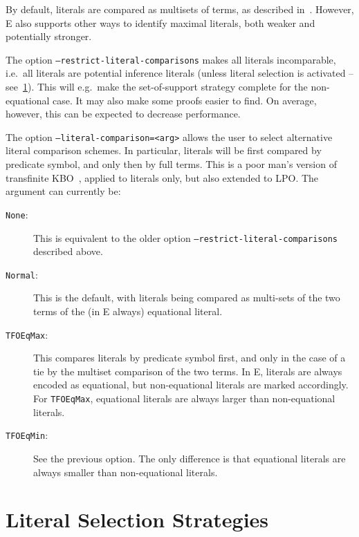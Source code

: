 \documentclass{report}
\begin{document}
By default, literals are compared as
multisets of terms, as described in~\cite{BG94}. However, E also
supports other ways to identify maximal literals, both weaker and
potentially stronger.

The option \texttt{--restrict-literal-comparisons} makes all literals
incomparable, i.e.\ all literals are potential inference literals
(unless literal selection is activated --
see~\ref{sec:options:strategies}). This will e.g.\ make the
set-of-support strategy complete for the non-equational case. It may
also make some proofs easier to find. On average, however, this can be
expected to decrease performance.

The option \texttt{--literal-comparison=<arg>} allows the user to
select alternative literal comparison schemes. In particular, literals
will be first compared by predicate symbol, and only then by full
terms. This is a poor man's version of transfinite
KBO~\cite{LW:LPAR-2007,KMV:CADE-2011}, applied to literals only, but
also extended to LPO. The argument can currently be:

\begin{description}
\item[\texttt{None}:] This is equivalent to the older option
  \texttt{--restrict-literal-comparisons} described above.
\item[\texttt{Normal}:] This is the default, with literals being
  compared as multi-sets of the two terms of the (in E always)
  equational literal.
\item[\texttt{TFOEqMax}:] This compares literals by predicate symbol
  first, and only in the case of a tie by the multiset comparison of
  the two terms. In E, literals are always encoded as equational, but
  non-equational literals are marked accordingly. For
  \texttt{TFOEqMax}, equational literals are always larger than
  non-equational literals.
\item[\texttt{TFOEqMin}:] See the previous option. The only difference
  is that equational literals are always smaller than non-equational
  literals.
\end{description}


\section{Literal Selection Strategies}
\label{sec:options:strategies}
\end{document}
